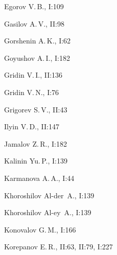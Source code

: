 \begin{theindex}
  \item Egorov V.\,B., I:109





  \indexspace





  \item Gasilov A.\,V., II:98


  \item Gorshenin A.\,K., I:62


  \item Goyushov A.\,I., I:182


  \item Gridin V.\,I., II:136


  \item Gridin V.\,N., I:76


  \item Grigorev S.\,V., II:43





  \indexspace





  \item Ilyin V.\,D., II:147





  \indexspace





  \item Jamalov Z.\,R., I:182





  \indexspace





  \item Kalinin Yu.\,P., I:139


  \item Karmanova A.\,A., I:44


  \item Khoroshilov Al-der~A., I:139


  \item Khoroshilov Al-ey~A., I:139


  \item Konovalov G.\,M., I:166


  \item Korepanov E.\,R., II:63, II:79, I:227



\end{theindex}
